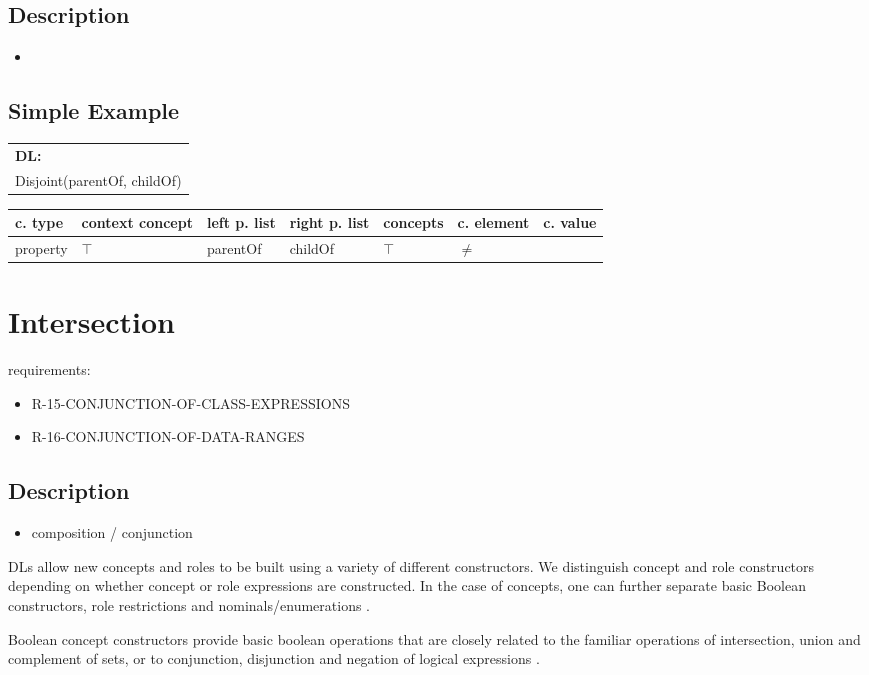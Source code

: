 \documentclass{llncs}
\newenvironment{gcotable}{
  \scriptsize
  \sffamily
  \vspace{0.3cm}
  \begin{tabular}{l|l|l|l|l|l|l}
  \hline
  \textbf{c. type} & \textbf{context concept} & \textbf{left p. list} & \textbf{right p. list} & \textbf{concepts} & \textbf{c. element} & \textbf{c. value} \\
  \hline

}{
  \hline
  \end{tabular}
  \linebreak
}
\newenvironment{DL}{
  \scriptsize
  \sffamily
  \vspace{0.3cm}
  \begin{tabular}{l}
	\textbf{DL:} \\

}{
  \end{tabular}
  \linebreak
}
\begin{document}
\subsection{Description}

\begin{itemize}
	\item 
\end{itemize}

\subsection{Simple Example}

\begin{DL}
Disjoint(parentOf, childOf)
\end{DL}

\begin{gcotable}
property & $\top$ & parentOf & childOf & $\top$ & $\ne$ \\
\end{gcotable}

\section{Intersection}

requirements:

\begin{itemize}
  \item R-15-CONJUNCTION-OF-CLASS-EXPRESSIONS
	\item R-16-CONJUNCTION-OF-DATA-RANGES
\end{itemize}

\subsection{Description}

\begin{itemize}
	\item composition / conjunction
\end{itemize}

DLs allow new concepts and roles to be
built using a variety of different constructors. We distinguish concept and role 
constructors depending on whether concept or role expressions are constructed. In the case of
concepts, one can further separate basic Boolean constructors, role restrictions and nominals/enumerations \cite{Kroetzsch2012}.

Boolean concept constructors provide basic boolean operations that are closely related to
the familiar operations of intersection, union and complement of sets, or to conjunction,
disjunction and negation of logical expressions \cite{Kroetzsch2012}.
\end{document}
